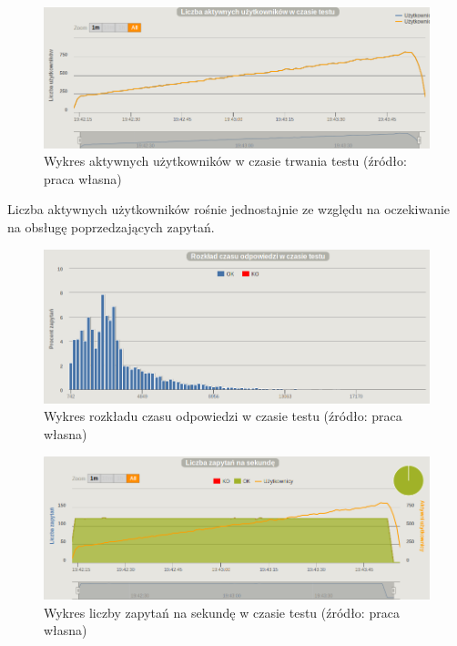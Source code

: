 \documentclass[12pt,twoside]{article}
\begin{document}
\begin{figure}[htbp]
\centering
\includegraphics[resolution=150]{test_results/elixir/file/screenshots/active_users.png}
\caption{Wykres aktywnych użytkowników w czasie trwania testu (źródło: praca własna)}
\end{figure}

Liczba aktywnych użytkowników rośnie jednostajnie ze względu na
oczekiwanie na obsługę poprzedzających zapytań.

\begin{figure}[htbp]
\centering
\includegraphics[resolution=150]{test_results/elixir/file/screenshots/distribution.png}
\caption{Wykres rozkładu czasu odpowiedzi w czasie testu (źródło: praca własna)}
\end{figure}

\begin{figure}[htbp]
\centering
\includegraphics[resolution=150]{test_results/elixir/file/screenshots/requests.png}
\caption{Wykres liczby zapytań na sekundę w czasie testu (źródło: praca własna)}
\end{figure}
\end{document}
